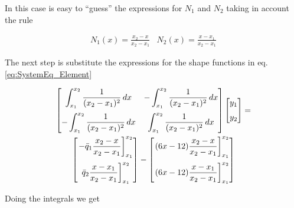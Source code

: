 \documentclass[letterpaper,10pt]{article}
\begin{document}
In this case is easy to ``guess'' the expressions for $N_1$ and $N_2$ taking in account the rule

\begin{equation}
\begin{array}{cc}
\displaystyle
N_1(x) = \frac{x_2 - x}{x_2 - x_1} & 
\displaystyle
N_2(x) = \frac{x - x_1}{x_2 - x_1}
\end{array}
\end{equation}

The next step is substitute the expressions for the shape functions in eq. \ref{eq:SystemEq_Element}

\begin{multline*}
\begin{bmatrix}
\displaystyle
\int_{x_1}^{x_2} \frac{1}{(x_2-x_1)^2} \, dx &
\displaystyle
-\int_{x_1}^{x_2} \frac{1}{(x_2-x_1)^2} \, dx \vspace{2mm} \\
\displaystyle
-\int_{x_1}^{x_2} \frac{1}{(x_2-x_1)^2} \, dx &
\displaystyle
\int_{x_1}^{x_2} \frac{1}{(x_2-x_1)^2} \, dx
\end{bmatrix}
\begin{bmatrix}
y_1 \vspace{2mm}\\
y_2
\end{bmatrix}
= \\
\begin{bmatrix}
\displaystyle
\left. -\bar{q}_1 \frac{x_2 - x}{x_2 - x_1} \right]_{x_1}^{x_2} \vspace{2mm}\\
\displaystyle
\left. \bar{q}_2 \frac{x - x_1}{x_2 - x_1} \right]_{x_1}^{x_2}
\end{bmatrix}
-
\begin{bmatrix}
\displaystyle
\left. (6x-12) \frac{x_2 - x}{x_2 - x_1} \right]_{x_1}^{x_2} \vspace{2mm}\\
\displaystyle
\left. (6x-12) \frac{x - x_1}{x_2 - x_1} \right]_{x_1}^{x_2}
\end{bmatrix}
\end{multline*}

Doing the integrals we get
\end{document}
